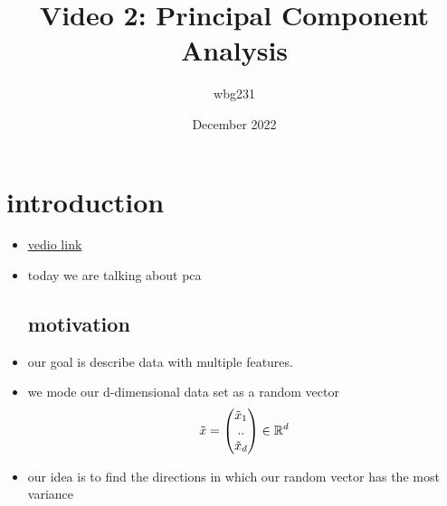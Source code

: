 \documentclass{article}
\title{Video 2: Principal Component Analysis}
\author{wbg231 }
\date{December 2022}
\begin{document}
\maketitle

\section{introduction}
\begin{itemize}
\item \href{https://www.youtube.com/watch?v=l9qIW_UBiZs}{vedio link}
\item today we are talking about pca 
\subsection*{motivation}
\item our goal is describe data with multiple features.
\item we mode our d-dimensional data set as a random vector $$\Tilde{x}=\begin{pmatrix}
    \Tilde{x}_1\\..\\\Tilde{x}_d
\end{pmatrix}\in \mathbb{R}^{d}$$
\item our idea is to find the directions in which our random vector has the most variance 

\end{itemize}
\end{document}

